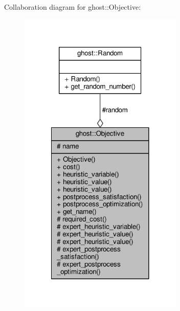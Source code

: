 Collaboration diagram for ghost\-:\-:Objective\-:
\nopagebreak
\begin{figure}[H]
\begin{center}
\leavevmode
\includegraphics[width=222pt]{classghost_1_1Objective__coll__graph}
\end{center}
\end{figure}
